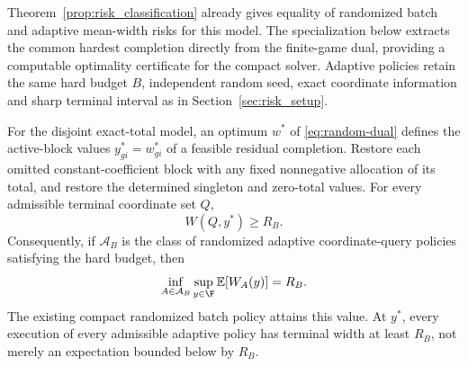 Theorem~\ref{prop:risk_classification} already gives equality of randomized
batch and adaptive mean-width risks for this model. The specialization below
extracts the common hardest completion directly from the finite-game dual,
providing a computable optimality certificate for the compact solver.
Adaptive policies retain the same hard budget $B$, independent random seed,
exact coordinate information and sharp terminal interval as in
Section~\ref{sec:risk_setup}.

\begin{proposition}
\label{prop:adaptive-dual-completion}
For the disjoint exact-total model, an optimum $w^*$ of
\eqref{eq:random-dual} defines the active-block values
$y^*_{gi}=w^*_{gi}$ of a feasible residual completion. Restore each omitted
constant-coefficient block with any fixed nonnegative allocation of its
total, and restore the determined singleton and zero-total values.
For every admissible terminal coordinate set $Q$,
\begin{equation}
 W(Q,y^*)\geq R_B.
 \label{eq:common-hardest-width}
\end{equation}
Consequently, if $\mathcal A_B$ is the class of randomized adaptive
coordinate-query policies satisfying the hard budget, then
\begin{equation}
 \inf_{A\in\mathcal A_B}\sup_{y\in\F}
       \mathbb E[W_A(y)] = R_B.
 \label{eq:adaptive-random-equality}
\end{equation}
The existing compact randomized batch policy attains this value. At $y^*$,
every execution of every admissible adaptive policy has terminal width at
least $R_B$, not merely an expectation bounded below by $R_B$.
\end{proposition}

